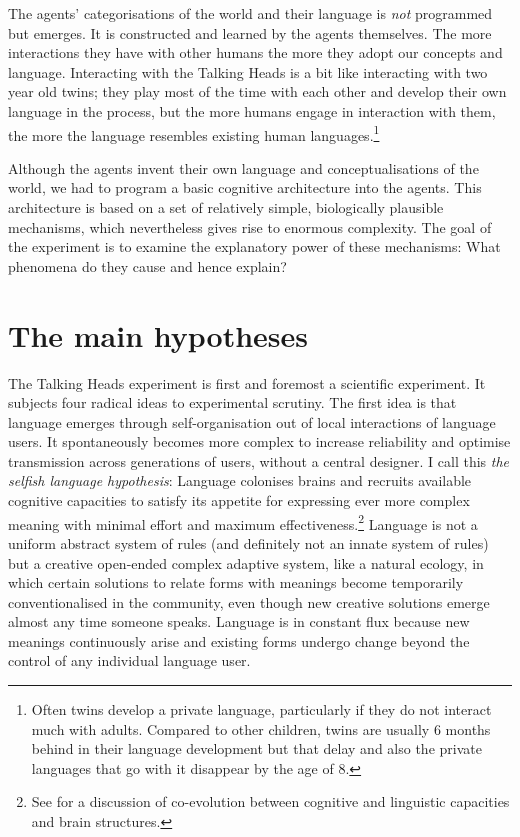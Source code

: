 The agents' categorisations of
the world and their language is {\itshape not} programmed but
emerges. It is 
constructed and learned by the agents themselves. The more 
interactions they have with other humans the more they 
adopt our concepts and language. Interacting with the Talking 
Heads is a bit like interacting with two year old 
twins; they play  most of the time with each other and
develop their own language in the process, but the more
humans engage in interaction with them, the more the language
resembles existing human languages.\footnote{Often twins develop a private language, particularly 
if they do not interact much with adults. Compared
to other children, twins are usually 6 months behind 
in their language development but that delay and 
also the private languages that go with it disappear
by the age of 8.}

Although the agents invent their own 
language and conceptualisations of the world, we
had to program a basic cognitive architecture into 
the agents. This architecture is based on a set of relatively
simple, biologically plausible mechanisms, which 
nevertheless gives rise to enormous complexity.
The goal of the experiment is to examine the explanatory power of 
these mechanisms: What phenomena do they cause and
hence explain? 

\section{The main hypotheses}

The Talking Heads experiment is first and foremost
a scientific experiment. It subjects four radical ideas 
to experimental scrutiny. 
The first idea is that 
language emerges through self-organisation out of local
interactions of language users. It spontaneously 
becomes more complex to increase
reliability and optimise transmission across generations of 
users, without a central designer.
I call this {\itshape the selfish
language hypothesis}: Language colonises
brains and recruits available cognitive capacities to satisfy
its appetite for expressing ever more complex meaning with
minimal effort and maximum 
effectiveness.\footnote{
See \cite{Deacon:1998} for a discussion of 
co-evolution between cognitive and linguistic
capacities and brain structures.}
Language is 
not a uniform abstract system of rules (and definitely not an 
innate system of rules) but a creative open-ended complex
adaptive system, like a natural
ecology, in which certain solutions to relate forms with 
meanings become temporarily conventionalised in 
the community, even though new creative solutions
emerge almost any time someone speaks. Language
is in constant flux because new meanings continuously
arise and existing forms undergo change beyond the 
control of any individual language user. 

